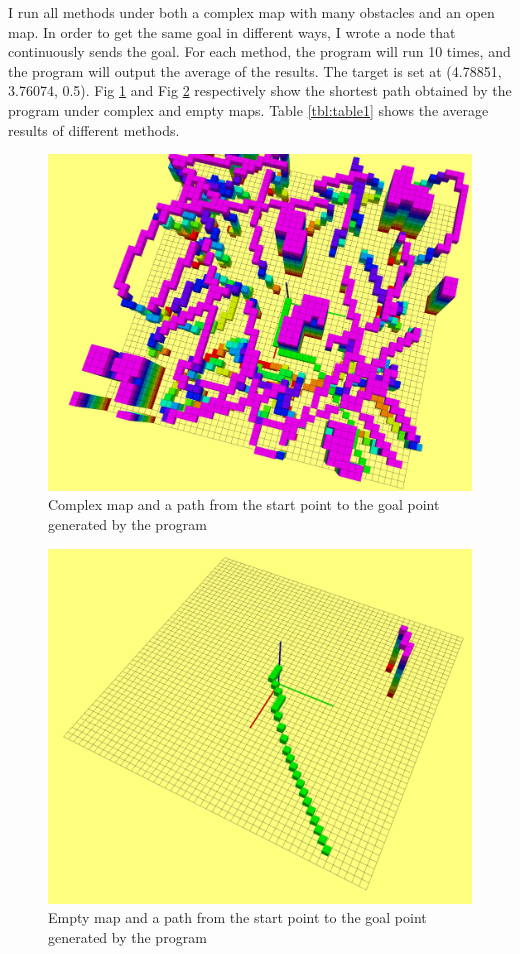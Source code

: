 \documentclass[conference]{IEEEtran}
\begin{document}
I run all methods under both a complex map with many obstacles and an open map. In order to get the same goal in different ways, I wrote a node that continuously sends the goal. For each method, the program will run 10 times, and the program will output the average of the results. The target is set at (4.78851, 3.76074, 0.5). Fig \ref{fig:label4_1} and Fig \ref{fig:label4_2} respectively show the shortest path obtained by the program under complex and empty maps. Table \ref {tbl:table1} shows the average results of different methods.

\begin{figure}[htbp]
	\centering
	\includegraphics[scale=0.2]{figs/fig4_1.png}
	\caption{Complex map and a path from the start point to the goal point generated by the program}
	\label{fig:label4_1}
\end{figure}

\begin{figure}[htbp]
	\centering
	\includegraphics[scale=0.2]{figs/fig4_2.png}
	\caption{Empty map and a path from the start point to the goal point generated by the program}
	\label{fig:label4_2}
\end{figure}
\end{document}
